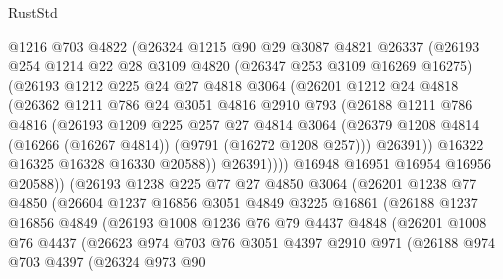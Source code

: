 \begin{lexlean}{RustStd}
\begin{coremodule}
            @1216
            @703
            @4822
            (@26324
              @1215
              @90
              @29
              @3087
              @4821
              @26337
              (@26193
                @254
                @1214
                @22
                @28
                @3109
                @4820
                (@26347 @253 @3109 @16269 @16275)
                (@26193
                  @1212
                  @225
                  @24
                  @27
                  @4818
                  @3064
                  (@26201
                    @1212
                    @24
                    @4818
                    (@26362
                      @1211
                      @786
                      @24
                      @3051
                      @4816
                      @2910
                      @793
                      (@26188
                        @1211
                        @786
                        @4816
                        (@26193
                          @1209
                          @225
                          @257
                          @27
                          @4814
                          @3064
                          (@26379 @1208 @4814 (@16266 (@16267 @4814)) (@9791 (@16272 @1208 @257)))
                          @26391))
                      @16322
                      @16325
                      @16328
                      @16330
                      @20588))
                  @26391))))
          @16948
          @16951
          @16954
          @16956
          @20588))
      (@26193
        @1238
        @225
        @77
        @27
        @4850
        @3064
        (@26201
          @1238
          @77
          @4850
          (@26604
            @1237
            @16856
            @3051
            @4849
            @3225
            @16861
            (@26188
              @1237
              @16856
              @4849
              (@26193
                @1008
                @1236
                @76
                @79
                @4437
                @4848
                (@26201
                  @1008
                  @76
                  @4437
                  (@26623
                    @974
                    @703
                    @76
                    @3051
                    @4397
                    @2910
                    @971
                    (@26188
                      @974
                      @703
                      @4397
                      (@26324
                        @973
                        @90

\end{coremodule}
\end{lexlean}
